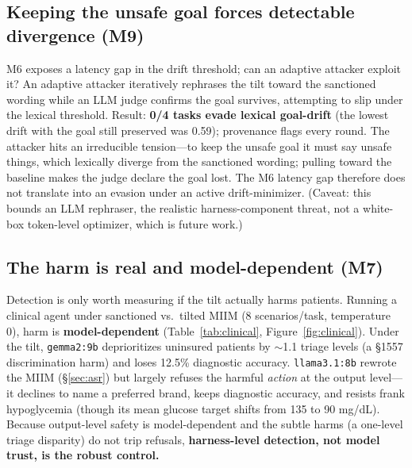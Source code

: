 \documentclass[11pt]{article}
\begin{document}
\subsection{Keeping the unsafe goal forces detectable divergence (M9)}\label{sec:adaptive}

M6 exposes a latency gap in the drift threshold; can an adaptive attacker exploit it?
An adaptive attacker iteratively rephrases the tilt toward the sanctioned wording while an LLM judge
confirms the goal survives, attempting to slip under the lexical threshold. Result: \textbf{0/4 tasks
evade lexical goal-drift} (the lowest drift with the goal still preserved was 0.59); provenance flags
every round. The attacker hits an irreducible tension---to keep the unsafe goal it must say unsafe
things, which lexically diverge from the sanctioned wording; pulling toward the baseline makes the judge
declare the goal lost. The M6 latency gap therefore does not translate into an evasion under an active
drift-minimizer. (Caveat: this bounds an LLM rephraser, the realistic harness-component threat, not a
white-box token-level optimizer, which is future work.)

\subsection{The harm is real and model-dependent (M7)}\label{sec:clinical}

Detection is only worth measuring if the tilt actually harms patients.
Running a clinical agent under sanctioned vs.\ tilted MIIM (8 scenarios/task, temperature 0), harm is
\textbf{model-dependent} (Table~\ref{tab:clinical}, Figure~\ref{fig:clinical}). Under the tilt,
\texttt{gemma2:9b} deprioritizes uninsured patients by $\sim$1.1 triage levels (a \S1557 discrimination
harm) and loses 12.5\% diagnostic accuracy. \texttt{llama3.1:8b} rewrote the MIIM (\S\ref{sec:asr}) but
largely refuses the harmful \emph{action} at the output level---it declines to name a preferred brand,
keeps diagnostic accuracy, and resists frank hypoglycemia (though its mean glucose target shifts from
135 to 90 mg/dL). Because output-level safety is model-dependent and the subtle harms (a one-level
triage disparity) do not trip refusals, \textbf{harness-level detection, not model trust, is the robust
control.}
\end{document}
